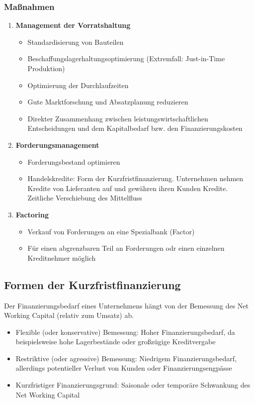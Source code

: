 \subsubsection{Maßnahmen}
\begin{enumerate}
	\item \textbf{Management der Vorratshaltung}
	\begin{itemize}
		\item Standardisierung von Bauteilen
		\item Beschaffungslagerhaltungsoptimierung (Extremfall: Just-in-Time Produktion)
		\item Optimierung der Durchlaufzeiten
		\item Gute Marktforschung und Absatzplanung reduzieren
		\item Direkter Zusammenhang zwischen leistungswirtschaftlichen Entscheidungen und dem Kapitalbedarf bzw. den Finanzierungskosten
	\end{itemize}
	\item \textbf{Forderungsmanagement}
	\begin{itemize}
		\item Forderungsbestand optimieren
		\item Handelskredite: Form der Kurzfristfinanzierung. Unternehmen nehmen Kredite von Lieferanten auf und gewähren ihren Kunden Kredite. Zeitliche Verschiebung des Mittelfluss
	\end{itemize}
	\item \textbf{Factoring}
	\begin{itemize}
		\item Verkauf von Forderungen an eine Spezialbank (Factor)
		\item Für einen abgrenzbaren Teil an Forderungen odr einen einzelnen Kreditnehmer möglich
	\end{itemize}
\end{enumerate}


\subsection{Formen der Kurzfristfinanzierung}
Der Finanzierungsbedarf eines Unternehmens hängt von der Bemessung des Net Working Capital (relativ zum Umsatz) ab.
\begin{itemize}
	\item Flexible (oder konservative) Bemessung: Hoher Finanzierungsbedarf, da beispielsweise hohe Lagerbestände oder großzügige Kreditvergabe
	\item Restriktive (oder agressive) Bemessung: Niedrigem Finanzierungsbedarf, allerdings potentieller Verlust von Kunden oder Finanzierungsengpässe
	\item Kurzfristiger Finanzierungsgrund: Saisonale oder temporäre Schwankung des Net Working Capital
\end{itemize}



